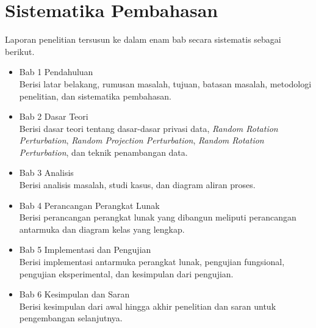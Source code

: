 \section{Sistematika Pembahasan}
\label{sec:sispem}
Laporan penelitian tersusun ke dalam enam bab secara sistematis sebagai berikut.
\begin{itemize}
    \item Bab 1 Pendahuluan\\
    Berisi latar belakang, rumusan masalah, tujuan, batasan masalah, metodologi penelitian, dan sistematika pembahasan.
    \item Bab 2 Dasar Teori\\
    Berisi dasar teori tentang dasar-dasar privasi data, \textit{Random Rotation Perturbation}, \textit{Random Projection Perturbation}, \textit{Random Rotation Perturbation}, dan teknik penambangan data.
    \item Bab 3 Analisis\\
    Berisi analisis masalah, studi kasus, dan diagram aliran proses.
    \item Bab 4 Perancangan Perangkat Lunak\\
    Berisi perancangan perangkat lunak yang dibangun meliputi perancangan antarmuka dan diagram kelas yang lengkap.
    \item Bab 5 Implementasi dan Pengujian\\
    Berisi implementasi antarmuka perangkat lunak, pengujian fungsional, pengujian eksperimental, dan kesimpulan dari pengujian.
    \item Bab 6 Kesimpulan dan Saran\\
    Berisi kesimpulan dari awal hingga akhir penelitian dan saran untuk pengembangan selanjutnya.
\end{itemize}